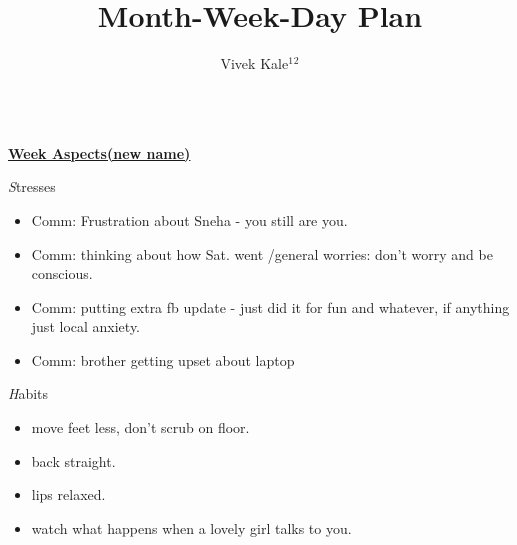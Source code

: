 \documentclass[serif,mathserif,final]{beamer}
\title{Month-Week-Day Plan}
\author{Vivek Kale$^1$$^2$}
\institute{$^1$ University of Illinois at Urbana-Champaign \quad}
\begin{document}
 
\begin{frame}{} 

  \begin{columns}[t]
\begin{column}{0.30\linewidth} {\textbf{\underline{Week Aspects(new name)}}}
  \begin{block}{\textit Stresses} 
    \begin{itemize}
    \item \tiny Comm: Frustration about Sneha - you still are you.
    \item \tiny Comm: thinking about how Sat. went /general worries:
      don't worry and be conscious. 
    \item \tiny Comm: putting extra fb update - just did it for fun
      and whatever, if anything just local anxiety. 
       \item \tiny Comm: brother getting upset about laptop 

    \end{itemize} 
  \end{block} 
  
  \begin{block}{\textit Habits } 
    \begin{itemize} 
      \tiny \item \tiny move feet less, don't scrub on floor. 
    \item \tiny back straight. 
    \item \tiny lips relaxed. 
    \item \tiny watch what happens when a lovely girl talks to you. 
    \end{itemize} 
  \end{block} 


\end{column}
\end{columns}
\end{frame}
\end{document}
